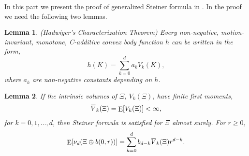 \documentclass[10pt, conference, letterpaper]{IEEEtran}
\newtheorem{lemma}{Lemma}
\DeclareMathOperator*{\E}{\mathrm{E}}
\newcommand{\overbar}[1]{\mkern 1.5mu\overline{\mkern-1.5mu#1\mkern-1.5mu}\mkern 1.5mu}
\begin{document}
In this part we present the proof of generalized Steiner formula in \cite{stochasticapp}. In the proof we need the following two lemmas. 
\begin{lemma}\label{lemma:characterization}
	(Hadwiger's Characterization Theorem) Every non-negative, motion-invariant, monotone, C-additive convex body function $h$ can be written in the form, 
	\begin{equation}\label{characterization}
	h(K) = \sum\limits_{k=0}^{d}a_kV_k(K),
	\end{equation}
	where $a_k$ are non-negative constants depending on $h$.
\end{lemma}
\begin{lemma}\label{lemma:steiner}
	If the intrinsic volumes of $\Xi$, $V_k(\Xi)$, have finite first moments,
	\begin{equation*}
	\overbar{V}_k(\Xi) = \E[V_k(\Xi)]<\infty,
	\end{equation*}
	for $k=0,1,\ldots, d$, then Steiner formula is satisfied for $\Xi$ almost surely. For $r\geq 0$, 
	\begin{equation}
	\E[\nu_d(\Xi \oplus b(0,r))] = \sum\limits_{k=0}^{d}b_{d-k}\overbar{V}_k(\Xi)r^{d-k}.
	\end{equation}
\end{lemma}
\end{document}
